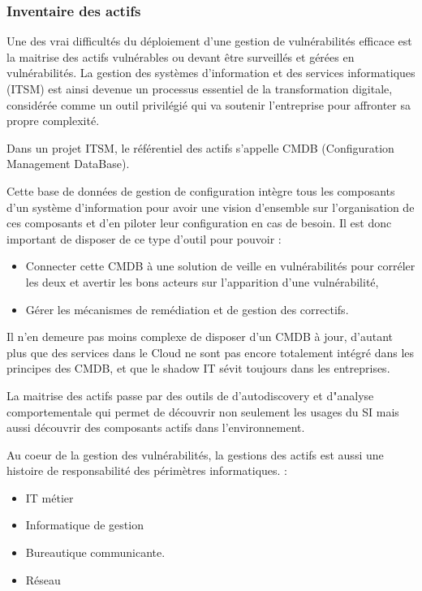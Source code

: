 \subsubsection{Inventaire des actifs}

Une des vrai difficultés du déploiement d'une gestion de vulnérabilités efficace est la maitrise des actifs vulnérables ou devant être surveillés et gérées en vulnérabilités.
La gestion des systèmes d'information et des services informatiques (ITSM) est ainsi devenue un processus essentiel de la transformation digitale, considérée comme un outil privilégié qui va soutenir l’entreprise pour affronter sa propre complexité.

Dans un projet ITSM, le référentiel des actifs s’appelle CMDB (Configuration Management DataBase).

Cette base de données de gestion de configuration intègre  tous les composants d’un système d'information pour  avoir une vision d’ensemble sur l’organisation de ces composants et d’en piloter leur configuration en cas de besoin.
Il est donc important de disposer de ce type d'outil pour pouvoir :

\begin{itemize}
  \item Connecter cette CMDB à une solution de veille en vulnérabilités pour corréler les deux et avertir les bons acteurs sur l'apparition d'une vulnérabilité,
\item Gérer les mécanismes de remédiation et de gestion des correctifs.
\end{itemize}

Il n'en demeure pas moins complexe de disposer d'un CMDB à jour, d'autant plus que des services dans le Cloud ne sont pas encore totalement intégré dans les principes des CMDB, et que le shadow IT  sévit toujours dans les entreprises.

La maitrise des actifs passe par des outils de d'autodiscovery et d"analyse comportementale qui permet de découvrir non seulement les usages du SI mais aussi découvrir des composants actifs dans l'environnement.

Au coeur de la gestion des vulnérabilités, la gestions des actifs est aussi une histoire de responsabilité des périmètres  informatiques. :

\begin{itemize}
  \item IT métier
  \item Informatique de gestion
  \item Bureautique communicante.
  \item Réseau
\end{itemize}




